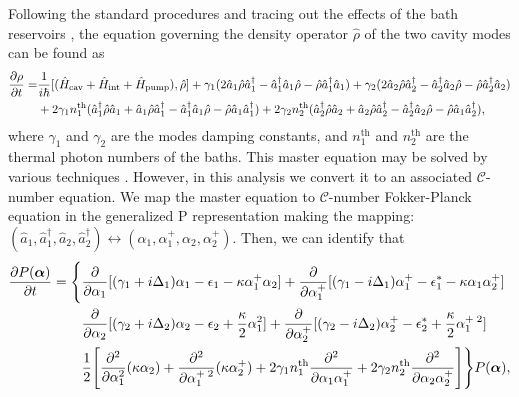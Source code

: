 \documentclass[fleqn,11pt]{wlscirep}
\begin{document}
Following the standard procedures and tracing out the effects of the bath reservoirs \cite{louisell1973,walls2008}, the equation governing the density operator $\hat{\rho}$ of the two cavity modes can be found as 
\begin{equation}
	\begin{aligned}
		\pdv{\rho}{t} =&
			\frac{1}{i\hbar} [(\hat{H}_{\text{cav}} + \hat{H}_{\text{int}} + \hat{H}_{\text{pump}}),\hat{\rho}] +
			\gamma_1(2\hat{a}_1\hat{\rho}\hat{a}_1^{\dagger} - 
			\hat{a}_1^{\dagger}\hat{a}_1\hat{\rho}
			-\hat{\rho}\hat{a}_1^{\dagger}\hat{a}_1) +
			\gamma_2(2\hat{a}_2\hat{\rho}\hat{a}_2^{\dagger} - 
			\hat{a}_2^{\dagger}\hat{a}_2\hat{\rho}
			-\hat{\rho}\hat{a}_2^{\dagger}\hat{a}_2) \\
			&+ 2\gamma_1n^{\text{th}}_1
			(\hat{a}_1^{\dagger}\hat{\rho}\hat{a}_1 + 
			\hat{a}_1\hat{\rho}\hat{a}_1^{\dagger} -
			\hat{a}_1^{\dagger}\hat{a}_1\hat{\rho}-
			\hat{\rho}\hat{a}_1\hat{a}_1^{\dagger})
			+ 2\gamma_2n^{\text{th}}_2
			(\hat{a}_2^{\dagger}\hat{\rho}\hat{a}_2 + 
			\hat{a}_2\hat{\rho}\hat{a}_2^{\dagger} -
			\hat{a}_2^{\dagger}\hat{a}_2\hat{\rho}-
			\hat{\rho}\hat{a}_1\hat{a}_2^{\dagger}),
	\end{aligned}
\end{equation}
where $\gamma_1$ and $\gamma_2$ are the modes damping constants, and $n^{\text{th}}_1$ and $n^{\text{th}}_2$ are the thermal photon numbers of the baths. This master equation may be solved by various techniques \cite{louisell1973}. However, in this analysis we convert it to an associated $\mathcal{C}$-number equation. We map the master equation to $\mathcal{C}$-number Fokker-Planck
equation in the generalized P representation \cite{walls2008} making the mapping: $(\hat{a}_1,\hat{a}_1^{\dagger},\hat{a}_2,\hat{a}_2^{\dagger}) \leftrightarrow ({\alpha}_1,{\alpha}_1^{+},{\alpha}_2,{\alpha}_2^{+})$. Then, we can identify that 
\begin{equation}
	\begin{aligned}
		\pdv{P(\boldsymbol{\alpha})}{t} =
		\Bigg\{&
			\pdv{\alpha_1}[(\gamma_1 + i\Delta_1)\alpha_1 - \epsilon_1 - \kappa\alpha_1^+\alpha_2]
			+
			\pdv{\alpha_1^+}[(\gamma_1 - i\Delta_1)\alpha_1^+ - \epsilon_1^* - \kappa\alpha_1\alpha_2^+]
			\\
			&\pdv{\alpha_2}[(\gamma_2 + i\Delta_2)\alpha_2 - \epsilon_2 + \frac{\kappa}{2}\alpha_1^2]
			+
			\pdv{\alpha_2^+}[(\gamma_2 - i\Delta_2)\alpha_2^+ - \epsilon_2^* + \frac{\kappa}{2}\alpha_1^{+\;2}]
			\\
			& \frac{1}{2}
			\Bigg[
				\pdv[2]{\alpha_1}(\kappa\alpha_2) 
				+ \frac{\partial^2}{\partial\alpha_1^{+\;2}}(\kappa\alpha_2^+)
				+ 2\gamma_1n^{\text{th}}_1\frac{\partial^2}{\partial\alpha_1\alpha_1^+}
				+ 2\gamma_2n^{\text{th}}_2\frac{\partial^2}{\partial\alpha_2\alpha_2^+}
			\Bigg]
		\Bigg\}P(\boldsymbol{\alpha}),
	\end{aligned}
\end{equation}
\end{document}

